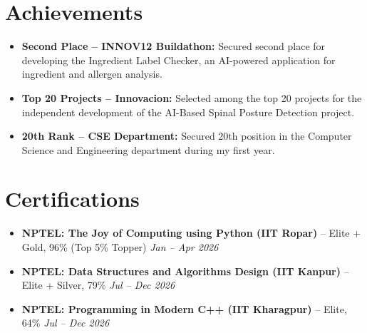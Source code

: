 \documentclass[10pt, a4paper]{article}
\begin{document}
\section{Achievements}
\begin{itemize}[leftmargin=*, noitemsep, topsep=1pt, parsep=0pt]
    \item \textbf{Second Place -- INNOV12 Buildathon:} Secured second place for developing the Ingredient Label Checker, an AI-powered application for ingredient and allergen analysis.
    \item \textbf{Top 20 Projects -- Innovacion:} Selected among the top 20 projects for the independent development of the AI-Based Spinal Posture Detection project.
    \item \textbf{20th Rank -- CSE Department:} Secured 20th position in the Computer Science and Engineering department during my first year.
\end{itemize}

\section{Certifications}
\begin{itemize}[leftmargin=*, noitemsep, topsep=1pt, parsep=0pt]
    \item \textbf{NPTEL: The Joy of Computing using Python (IIT Ropar)} -- Elite + Gold, 96\% (Top 5\% Topper) \hfill \textit{Jan -- Apr 2026}
    \item \textbf{NPTEL: Data Structures and Algorithms Design (IIT Kanpur)} -- Elite + Silver, 79\% \hfill \textit{Jul -- Dec 2026}
    \item \textbf{NPTEL: Programming in Modern C++ (IIT Kharagpur)} -- Elite, 64\% \hfill \textit{Jul -- Dec 2026}
\end{itemize}
\end{document}
